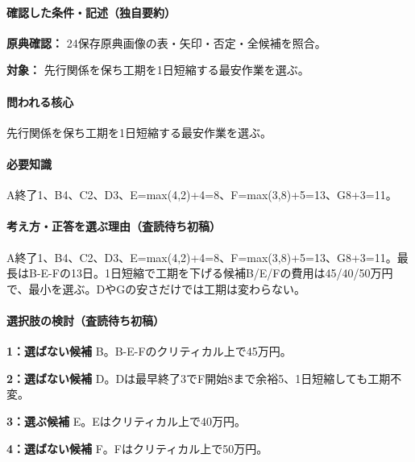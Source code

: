 \paragraph{確認した条件・記述（独自要約）}\mbox{}\par

\noindent\textbf{原典確認：} 24保存原典画像の表・矢印・否定・全候補を照合。\par

\noindent\textbf{対象：} 先行関係を保ち工期を1日短縮する最安作業を選ぶ。\par

\paragraph{問われる核心} 先行関係を保ち工期を1日短縮する最安作業を選ぶ。

\paragraph{必要知識} A終了1、B4、C2、D3、E=\allowbreak{}max(4,2)+4=\allowbreak{}8、F=\allowbreak{}max(3,8)+5=\allowbreak{}13、G8+3=\allowbreak{}11。

\paragraph{考え方・正答を選ぶ理由（査読待ち初稿）} A終了1、B4、C2、D3、E=\allowbreak{}max(4,2)+4=\allowbreak{}8、F=\allowbreak{}max(3,8)+5=\allowbreak{}13、G8+3=\allowbreak{}11。最長はB-E-Fの13日。1日短縮で工期を下げる候補B/E/Fの費用は45/40/50万円で、最小を選ぶ。DやGの安さだけでは工期は変わらない。

\paragraph{選択肢の検討（査読待ち初稿）}\mbox{}\par

\noindent\textbf{1：選ばない候補} B。B-E-Fのクリティカル上で45万円。\par

\noindent\textbf{2：選ばない候補} D。Dは最早終了3でF開始8まで余裕5、1日短縮しても工期不変。\par

\noindent\textbf{3：選ぶ候補} E。Eはクリティカル上で40万円。\par

\noindent\textbf{4：選ばない候補} F。Fはクリティカル上で50万円。\par

